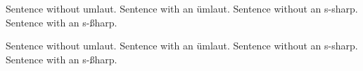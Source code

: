\documentclass{article}
\begin{document}
\noindent
Sentence without umlaut.\newline
Sentence with an ümlaut.\newline
Sentence without an s-sharp.\newline
Sentence with an s-ßharp.\newline

\noindent
Sentence without umlaut.\newline
Sentence with an ümlaut.\newline
Sentence without an s-sharp.\newline
Sentence with an s-ßharp.\newline
\end{document}
